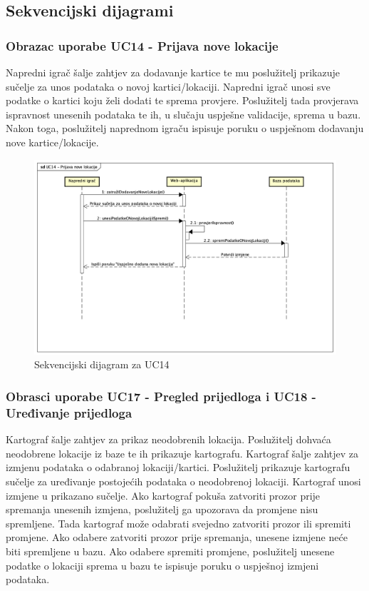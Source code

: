 			\pagebreak
			\subsection{Sekvencijski dijagrami}
				
				\subsubsection{Obrazac uporabe UC14 - Prijava nove lokacije}
				
				Napredni igrač šalje zahtjev za dodavanje kartice te mu poslužitelj prikazuje sučelje za unos podataka o novoj kartici/lokaciji. Napredni igrač unosi sve podatke o kartici koju želi dodati te sprema provjere. Poslužitelj tada provjerava ispravnost unesenih podataka te ih, u slučaju uspješne validacije, sprema u bazu. Nakon toga, poslužitelj naprednom igraču ispisuje poruku o uspješnom dodavanju nove kartice/lokacije.
				
				\begin{figure}[H]
        			\includegraphics[scale=0.4]{slike/Sekvencijski dijagrami/UC14 - Prijava nove lokacije.png}
        			\centering
        			\caption{Sekvencijski dijagram za UC14}
        			\label{fig:promjene}
        		\end{figure}
				
				\pagebreak
				\subsubsection{Obrasci uporabe UC17 - Pregled prijedloga i UC18 - Uređivanje prijedloga}
				
				Kartograf šalje zahtjev za prikaz neodobrenih lokacija. Poslužitelj dohvaća neodobrene lokacije iz baze te ih prikazuje kartografu. Kartograf šalje zahtjev za izmjenu podataka o odabranoj lokaciji/kartici. Poslužitelj prikazuje kartografu sučelje za uređivanje postojećih podataka o neodobrenoj lokaciji. Kartograf unosi izmjene u prikazano sučelje. Ako kartograf pokuša zatvoriti prozor prije spremanja unesenih izmjena, poslužitelj ga upozorava da promjene nisu spremljene. Tada kartograf može odabrati svejedno zatvoriti prozor ili spremiti promjene. Ako odabere zatvoriti prozor prije spremanja, unesene izmjene neće biti spremljene u bazu. Ako odabere spremiti promjene, poslužitelj unesene podatke o lokaciji sprema u bazu te ispisuje poruku o uspješnoj izmjeni podataka.
				
